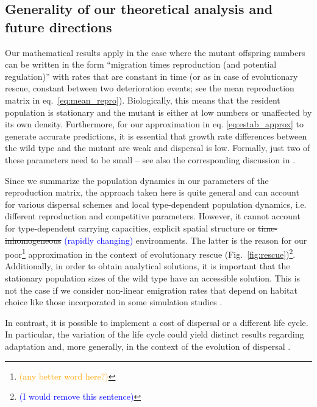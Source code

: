 \documentclass[a4paper,11pt]{article}
\newcommand{\francois}[1]{\textcolor{blue}{(#1)}}
\newcommand{\pete}[1]{\textcolor{orange}{(#1)}}
\newcommand{\chg}[1]{\textcolor{change}{#1}}
\begin{document}
\subsection*{Generality of our theoretical analysis and future directions}
Our mathematical results apply in the case where the mutant offspring numbers can be written in the form ``migration times reproduction (and potential regulation)'' with rates that are constant in time (\chg{or as in case of evolutionary rescue, constant between two deterioration events}; see the mean reproduction matrix in eq.~\eqref{eq:mean_repro}). Biologically, this means that the resident population is stationary and the mutant is either at low numbers or unaffected by its own density. Furthermore, for our approximation in eq. \eqref{eq:estab_approx} to generate accurate predictions, it is essential that growth rate differences between the wild type and the mutant are weak and dispersal is low. Formally, just two of these parameters need to be small -- see also the corresponding discussion in \citet{tomasini_2018}. 

Since we summarize the population dynamics in our parameters of the reproduction matrix, the approach taken here is quite general and can account for various dispersal schemes and local \chg{type-dependent} population dynamics, \chg{i.e. different reproduction and competitive parameters.} However, it cannot account for \chg{type-dependent carrying capacities, explicit spatial structure %
or \st{time-inhomogeneous} \francois{rapidly changing} environments.}  The \chg{latter} is the reason for our \chg{poor}\footnote{\pete{any better word here?}} approximation in the context of evolutionary rescue (Fig.~\ref{fig:rescue})\footnote{\francois{I would remove this sentence}}. Additionally, in order to obtain analytical solutions, it is important that the stationary population sizes of the wild type have an accessible solution. This is not the case if we consider non-linear emigration rates that depend on habitat choice like those incorporated in some simulation studies \citep[e.g][]{holt_2015,mortier_2018}.  

In contrast, it \chg{is} possible to \chg{implement} a cost of dispersal \chg{or} a different life cycle. In particular, the variation of the life cycle could yield \chg{distinct} results regarding adaptation \citep{holt_2015} and, more generally, in the context of the evolution of dispersal \citep{massol_2015}. \\
\end{document}
